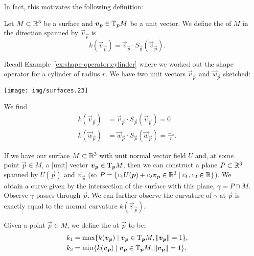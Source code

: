 In fact, this motivates the following definition:

\begin{definition}
Let $M\subset\mathbb{R}^{3}$ be a surface and
$\boldsymbol{v}_{\boldsymbol{p}}\in\mathrm{T}_{\boldsymbol{p}}M$ be a unit vector. We define the
 of $M$ in the direction spanned by
$\vec{v}_{\vec{p}}$ is
\begin{equation}
k(\vec{v}_{\vec{p}}) = \vec{v}_{\vec{p}}\cdot S_{\vec{p}}(\vec{v}_{\vec{p}}).
\end{equation}
\end{definition}


\begin{example}
Recall Example~\ref{ex:shape-operator:cylinder}
where we worked out the shape operator for a cylinder of radius $r$. We
have two unit vectors $\vec{v}_{\vec{p}}$ and $\vec{w}_{\vec{p}}$ sketched:
  \begin{center}
    \texttt{[image: img/surfaces.23]}
  \end{center}
  We find
\begin{subequations}
\begin{align}
k(\vec{v}_{\vec{p}}) &= \vec{v}_{\vec{p}}\cdot S_{\vec{p}}(\vec{v}_{\vec{p}})=0\\
k(\vec{w}_{\vec{p}}) &= \vec{w}_{\vec{p}}\cdot S_{\vec{p}}(\vec{w}_{\vec{p}})=\frac{-1}{r}.
\end{align}
\end{subequations}
    \end{example}

If we have our surface $M\subset\mathbb{R}^{3}$ with unit normal vector field
$U$ and, at some point $\vec{p}\in M$, a [unit] vector
$\boldsymbol{v}_{\boldsymbol{p}}\in\mathrm{T}_{\boldsymbol{p}}M$, then we can construct a plane
$P\subset\mathbb{R}^{3}$ spanned by $U(\vec{p})$ and $\vec{v}_{\vec{p}}$ (so $P=\{c_{1}U(\boldsymbol{p})+c_{2}\boldsymbol{v}_{\boldsymbol{p}}\in\mathbb{R}^{3}\mid c_{1},c_{2}\in\mathbb{R}\}$).
We obtain a curve given by the intersection of the surface with this plane,
$\gamma = P\cap M$. Observe $\gamma$ passes through $\vec{p}$.
We can further observe the curvature of $\gamma$ at $\vec{p}$ is exactly
equal to the normal curvature
$k(\vec{v}_{\vec{p}})$.

\begin{definition}
Given a point $\vec{p}\in M$, we define the 
at $\vec{p}$ to be:
\begin{subequations}
\begin{align}
k_{1} &= \max\{k(\boldsymbol{v}_{\boldsymbol{p}})\mid \boldsymbol{v}_{\boldsymbol{p}}\in\mathrm{T}_{\boldsymbol{p}}M,\|\boldsymbol{v}_{\boldsymbol{p}}\|=1\},\\
k_{2} &= \min\{k(\boldsymbol{v}_{\boldsymbol{p}})\mid \boldsymbol{v}_{\boldsymbol{p}}\in\mathrm{T}_{\boldsymbol{p}}M,\|\boldsymbol{v}_{\boldsymbol{p}}\|=1\}.
\end{align}
\end{subequations}
\end{definition}

